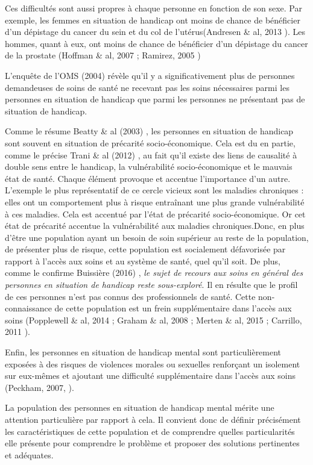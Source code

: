 Ces difficultés sont aussi propres à chaque personne en fonction de son sexe. Par exemple, les femmes en situation de handicap ont moins de chance de bénéficier d'un dépistage du cancer du sein et du col de l'utérus(Andresen \& al, 2013 \cite{Andresen2013}). Les hommes, quant à eux, ont moins de chance de bénéficier d'un dépistage du cancer de la prostate (Hoffman \& al, 2007 \cite{Hoffman2007}; Ramirez, 2005 \cite{Ramirez2005})

L'enquête de l'OMS (2004) \cite{OMS2004} révèle qu'il y a significativement plus de personnes demandeuses de soins de santé ne recevant pas les soins nécessaires parmi les personnes en situation de handicap que parmi les personnes ne présentant pas de situation de handicap.

Comme le résume Beatty \& al (2003) \cite{Beatty2003}, les personnes en situation de handicap sont souvent en situation de précarité socio-économique. Cela est du en partie, comme le précise Trani \& al (2012) \cite{Trani2012}, au fait qu'il existe des liens de causalité à double sens entre le handicap, la vulnérabilité socio-économique et le mauvais état de santé. Chaque élément provoque et accentue l'importance d'un autre. L'exemple le plus représentatif de ce cercle vicieux sont les maladies chroniques : elles ont un comportement plus à risque entraînant une plus grande vulnérabilité à ces maladies. Cela est accentué par l'état de précarité socio-économique. Or cet état de précarité accentue la vulnérabilité aux maladies chroniques.Donc, en plus d'être une population ayant un besoin de soin supérieur au reste de la population, de présenter plus de risque, cette population est socialement défavorisée par rapport à l'accès aux soins et au système de santé, quel qu'il soit. De plus, comme le confirme Buissière (2016) \cite{Bussiere2016}, \og \textit{le sujet de recours aux soins en général des personnes en situation de handicap reste sous-exploré}\fg{}. Il en résulte que le profil de ces personnes n'est pas connus des professionnels de santé. Cette non-connaissance de cette population est un frein supplémentaire dans l'accès aux soins (Popplewell \& al, 2014 \cite{Popplewell2014}; Graham \& al, 2008 \cite{GrahamMann2008}; Merten \& al, 2015 \cite{Merten2015}; Carrillo, 2011 \cite{Carrillo2011}).

Enfin, les personnes en situation de handicap mental sont particulièrement exposées à des risques de violences morales ou sexuelles renforçant un isolement sur eux-mêmes et ajoutant une difficulté supplémentaire dans l'accès aux soins (Peckham, 2007, \cite{Peckham2007}).

La population des personnes en situation de handicap mental mérite une attention particulière par rapport à cela. Il convient donc de définir précisément les caractéristiques de cette population et de comprendre quelles particularités elle présente pour comprendre le problème et proposer des solutions pertinentes et adéquates.

